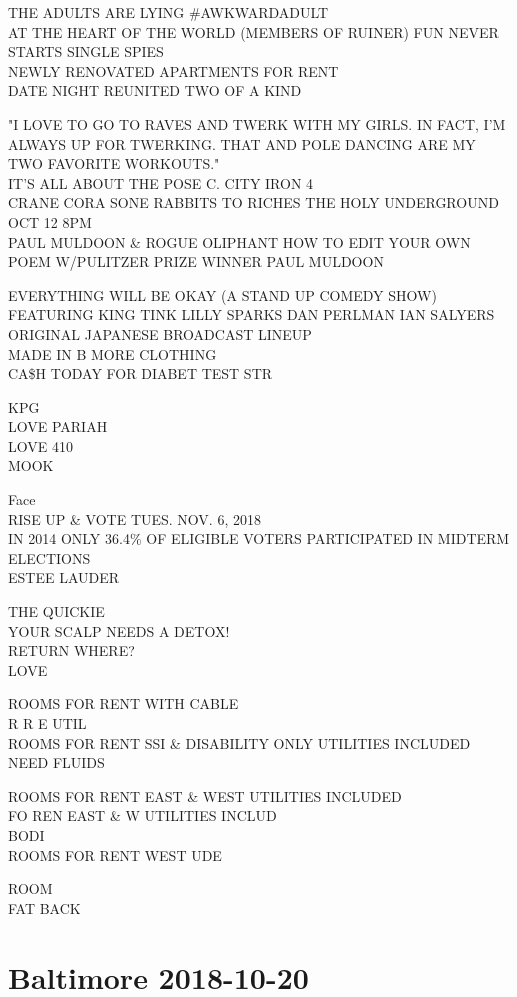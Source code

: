 \documentclass[10pt,letterpaper]{article}
\begin{document}
THE ADULTS ARE LYING \#AWKWARDADULT\\
AT THE HEART OF THE WORLD (MEMBERS OF RUINER) FUN NEVER STARTS SINGLE SPIES\\
NEWLY RENOVATED APARTMENTS FOR RENT\\
DATE NIGHT REUNITED TWO OF A KIND

"I LOVE TO GO TO RAVES AND TWERK WITH MY GIRLS.  IN FACT, I'M ALWAYS UP FOR TWERKING.  THAT AND POLE DANCING ARE MY TWO FAVORITE WORKOUTS."\\
IT'S ALL ABOUT THE POSE C. CITY IRON 4\\
CRANE CORA SONE RABBITS TO RICHES THE HOLY UNDERGROUND OCT 12 8PM\\
PAUL MULDOON \& ROGUE OLIPHANT HOW TO EDIT YOUR OWN POEM W/PULITZER PRIZE WINNER PAUL MULDOON

EVERYTHING WILL BE OKAY (A STAND UP COMEDY SHOW) FEATURING KING TINK LILLY SPARKS DAN PERLMAN IAN SALYERS\\
ORIGINAL JAPANESE BROADCAST LINEUP\\
MADE IN B MORE CLOTHING\\
CA\$H TODAY FOR DIABET TEST STR

KPG\\
LOVE PARIAH\\
LOVE 410\\
MOOK

Face\\
RISE UP \& VOTE TUES. NOV. 6, 2018\\
IN 2014 ONLY 36.4\% OF ELIGIBLE VOTERS PARTICIPATED IN MIDTERM ELECTIONS\\
ESTEE LAUDER

THE QUICKIE\\
YOUR SCALP NEEDS A DETOX!\\
RETURN WHERE?\\
LOVE

ROOMS FOR RENT WITH CABLE\\
R R E UTIL\\
ROOMS FOR RENT SSI \& DISABILITY ONLY UTILITIES INCLUDED\\
NEED FLUIDS

ROOMS FOR RENT EAST \& WEST UTILITIES INCLUDED\\
FO REN EAST \& W UTILITIES INCLUD\\
BODI\\
ROOMS FOR RENT WEST UDE

ROOM\\
FAT BACK


\section*{Baltimore 2018-10-20}
\end{document}
